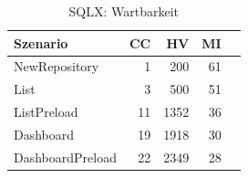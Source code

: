 \begin{table}[ht]
\centering
\caption{SQLX: Wartbarkeit}
\begin{tabular}{lrrrr}
\toprule
Szenario & CC & HV & MI \\
\midrule
	NewRepository & 1 & 200 & 61 \\
	List & 3 & 500 & 51 \\
	ListPreload & 11 & 1352 & 36 \\
	Dashboard & 19 & 1918 & 30 \\
	DashboardPreload & 22 & 2349 & 28 \\
\bottomrule
\end{tabular}
\label{tab:sqlx_maintainability}
\end{table}
	